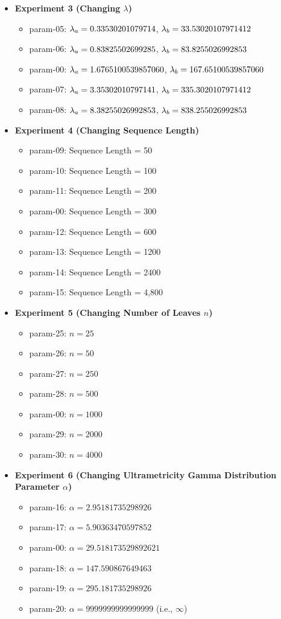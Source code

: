 \begin{itemize}
\item \textbf{Experiment 3 (Changing $\lambda$)}
\begin{itemize}
\item param-05: $\lambda_a = 0.33530201079714$, $\lambda_b = 33.53020107971412$
\item param-06: $\lambda_a = 0.83825502699285$, $\lambda_b = 83.8255026992853$
\item param-00: $\lambda_a = 1.6765100539857060$, $\lambda_b = 167.65100539857060$
\item param-07: $\lambda_a = 3.35302010797141$, $\lambda_b = 335.3020107971412$
\item param-08: $\lambda_a = 8.38255026992853$, $\lambda_b = 838.255026992853$
\end{itemize}

\item \textbf{Experiment 4 (Changing Sequence Length)}
\begin{itemize}
\item param-09: Sequence Length = 50
\item param-10: Sequence Length = 100
\item param-11: Sequence Length = 200
\item param-00: Sequence Length = 300
\item param-12: Sequence Length = 600
\item param-13: Sequence Length = 1200
\item param-14: Sequence Length = 2400
\item param-15: Sequence Length = 4,800
\end{itemize}

\item \textbf{Experiment 5 (Changing Number of Leaves $n$)}
\begin{itemize}
\item param-25: $n = 25$
\item param-26: $n = 50$
\item param-27: $n = 250$
\item param-28: $n = 500$
\item param-00: $n = 1000$
\item param-29: $n = 2000$
\item param-30: $n = 4000$
\end{itemize}

\item \textbf{Experiment 6 (Changing Ultrametricity Gamma Distribution Parameter $\alpha$)}
\begin{itemize}
\item param-16: $\alpha = 2.95181735298926$
\item param-17: $\alpha = 5.90363470597852$
\item param-00: $\alpha = 29.518173529892621$
\item param-18: $\alpha = 147.590867649463$
\item param-19: $\alpha = 295.181735298926$
\item param-20: $\alpha = 9999999999999999$ (i.e., $\infty$)
\end{itemize}
\end{itemize}


